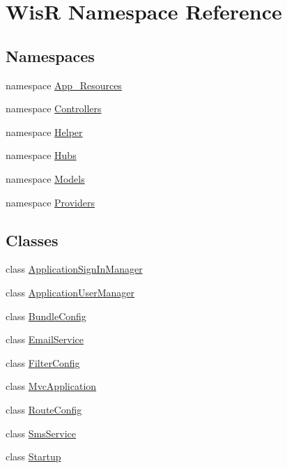 \hypertarget{namespace_wis_r}{}\section{Wis\+R Namespace Reference}
\label{namespace_wis_r}
\subsection*{Namespaces}
\begin{DoxyCompactItemize}
\item 
namespace \hyperlink{namespace_wis_r_1_1_app___resources}{App\+\_\+\+Resources}
\item 
namespace \hyperlink{namespace_wis_r_1_1_controllers}{Controllers}
\item 
namespace \hyperlink{namespace_wis_r_1_1_helper}{Helper}
\item 
namespace \hyperlink{namespace_wis_r_1_1_hubs}{Hubs}
\item 
namespace \hyperlink{namespace_wis_r_1_1_models}{Models}
\item 
namespace \hyperlink{namespace_wis_r_1_1_providers}{Providers}
\end{DoxyCompactItemize}
\subsection*{Classes}
\begin{DoxyCompactItemize}
\item 
class \hyperlink{class_wis_r_1_1_application_sign_in_manager}{Application\+Sign\+In\+Manager}
\item 
class \hyperlink{class_wis_r_1_1_application_user_manager}{Application\+User\+Manager}
\item 
class \hyperlink{class_wis_r_1_1_bundle_config}{Bundle\+Config}
\item 
class \hyperlink{class_wis_r_1_1_email_service}{Email\+Service}
\item 
class \hyperlink{class_wis_r_1_1_filter_config}{Filter\+Config}
\item 
class \hyperlink{class_wis_r_1_1_mvc_application}{Mvc\+Application}
\item 
class \hyperlink{class_wis_r_1_1_route_config}{Route\+Config}
\item 
class \hyperlink{class_wis_r_1_1_sms_service}{Sms\+Service}
\item 
class \hyperlink{class_wis_r_1_1_startup}{Startup}
\end{DoxyCompactItemize}
